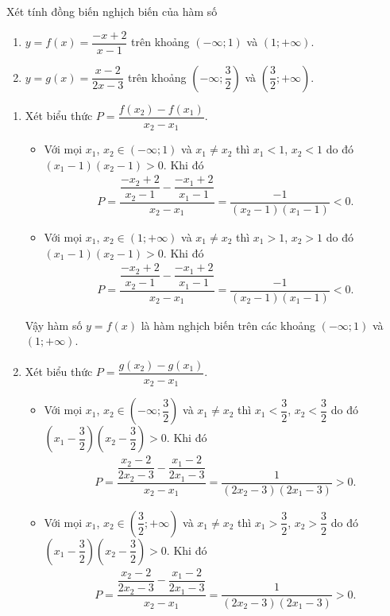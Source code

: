 \begin{bt}%
	Xét tính đồng biến nghịch biến của hàm số
	\begin{enumerate}
		\item $y=f(x)=\dfrac{-x+2}{x-1}$ trên khoảng $(-\infty;1)$ và $(1;+\infty)$.
		\item $y=g(x)=\dfrac{x-2}{2x-3}$ trên khoảng $\left(-\infty;\dfrac{3}{2}\right)$ và $\left(\dfrac{3}{2};+\infty\right)$.
	\end{enumerate}
	\loigiai
	{
		\begin{enumerate}
			\item Xét biểu thức $P=\dfrac{f(x_2)-f(x_1)}{x_2-x_1}$.
			      \begin{itemize}
				      \item Với mọi $x_1$, $x_2\in (-\infty;1)$ và $x_1\neq x_2$ thì $x_1<1$, $x_2<1$ do đó $(x_1-1)(x_2-1)>0$. Khi đó
				            \begin{align*}
					            P=\dfrac{\dfrac{-x_2+2}{x_2-1}-\dfrac{-x_1+2}{x_1-1}}{x_2-x_1}=\dfrac{-1}{(x_2-1)(x_1-1)}<0.
				            \end{align*}
				      \item Với mọi $x_1$, $x_2\in (1;+\infty)$ và $x_1\neq x_2$ thì $x_1>1$, $x_2>1$ do đó $(x_1-1)(x_2-1)>0$. Khi đó
				            \begin{align*}
					            P=\dfrac{\dfrac{-x_2+2}{x_2-1}-\dfrac{-x_1+2}{x_1-1}}{x_2-x_1}=\dfrac{-1}{(x_2-1)(x_1-1)}<0.
				            \end{align*}
			      \end{itemize}
			      Vậy hàm số $y=f(x)$ là hàm nghịch biến trên các khoảng $(-\infty;1)$ và $(1;+\infty)$.
			\item Xét biểu thức $P=\dfrac{g(x_2)-g(x_1)}{x_2-x_1}$.
			      \begin{itemize}
				      \item Với mọi $x_1$, $x_2\in \left(-\infty;\dfrac{3}{2}\right)$ và $x_1\neq x_2$ thì $x_1<\dfrac{3}{2}$, $x_2<\dfrac{3}{2}$ do đó $\left(x_1-\dfrac{3}{2}\right)\left(x_2-\dfrac{3}{2}\right)>0$. Khi đó
				            \begin{align*}
					            P=\dfrac{\dfrac{x_2-2}{2x_2-3}-\dfrac{x_1-2}{2x_1-3}}{x_2-x_1}=\dfrac{1}{(2x_2-3)(2x_1-3)}>0.
				            \end{align*}
				      \item Với mọi $x_1$, $x_2\in \left(\dfrac{3}{2};+\infty\right)$ và $x_1\neq x_2$ thì $x_1>\dfrac{3}{2}$, $x_2>\dfrac{3}{2}$ do đó $\left(x_1-\dfrac{3}{2}\right)\left(x_2-\dfrac{3}{2}\right)>0$. Khi đó
				            \begin{align*}
					            P=\dfrac{\dfrac{x_2-2}{2x_2-3}-\dfrac{x_1-2}{2x_1-3}}{x_2-x_1}=\dfrac{1}{(2x_2-3)(2x_1-3)}>0.
				            \end{align*}
			      \end{itemize}
		\end{enumerate}
	}
\end{bt}

